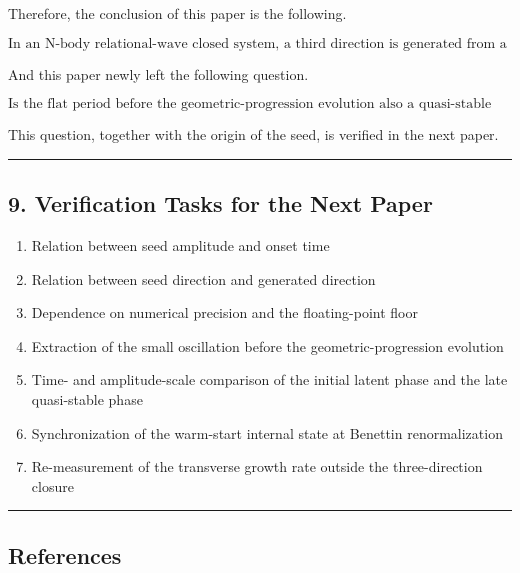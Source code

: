 \documentclass[
  a4paper,
]{article}
\providecommand{\tightlist}{%
  \setlength{\itemsep}{0pt}\setlength{\parskip}{0pt}}
\begin{document}
Therefore, the conclusion of this paper is the following.

\[
\boxed{
\text{In an N-body relational-wave closed system, a third direction is generated from a two-direction initial state, and a three-direction space is established as a dynamical quasi-stable closure.}
}
\]

And this paper newly left the following question.

\[
\boxed{
\text{Is the flat period before the geometric-progression evolution also a quasi-stable state at a smaller scale?}
}
\]

This question, together with the origin of the seed, is verified in the
next paper.

\begin{center}\rule{0.5\linewidth}{0.5pt}\end{center}

\subsection{9. Verification Tasks for the Next
Paper}\label{verification-tasks-for-the-next-paper}

\begin{enumerate}
\def\labelenumi{\arabic{enumi}.}
\tightlist
\item
  Relation between seed amplitude and onset time
\item
  Relation between seed direction and generated direction
\item
  Dependence on numerical precision and the floating-point floor
\item
  Extraction of the small oscillation before the geometric-progression
  evolution
\item
  Time- and amplitude-scale comparison of the initial latent phase and
  the late quasi-stable phase
\item
  Synchronization of the warm-start internal state at Benettin
  renormalization
\item
  Re-measurement of the transverse growth rate outside the
  three-direction closure
\end{enumerate}

\begin{center}\rule{0.5\linewidth}{0.5pt}\end{center}

\subsection{References}\label{references}
\end{document}
